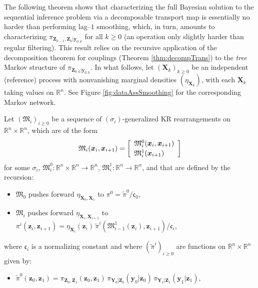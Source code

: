 \documentclass[twoside,11pt]{article}
\newcommand{\re}{\mathbb{R}}
\newcommand{\ra}{\rightarrow}
\newcommand{\Xb}{\boldsymbol{X}}
\newcommand{\xb}{\boldsymbol{x}}
\newcommand{\Yb}{\boldsymbol{Y}}
\newcommand{\yb}{\boldsymbol{y}}
\newcommand{\Zb}{\boldsymbol{Z}}
\newcommand{\zb}{\boldsymbol{z}}
\newcommand{\submap}{\mathfrak{M}}
\begin{document}
%
%
The following theorem shows that
characterizing  the full Bayesian solution to the 
sequential inference problem via a decomposable transport map  
is essentially no harder than performing lag--$1$ smoothing, which,
in turn, amounts
to characterizing $\pi_{\Zb_{k-1},\Zb_{k} \vert \yb_{0:k}}$
%
for all $k\ge 0$
(an operation only slightly
%
harder than regular filtering).
%
%
This result relies on
the recursive application of the decomposition theorem for
couplings (Theorem \ref{thm:decompTrans}) 
to the {\it tree}
Markov structure of $\pi_{\Zb_{0:k} \vert \yb_{0:k}}$.
%
In what follows, let $(\Xb_k)_{k \ge 0}$ be an independent 
%
(reference) process with nonvanishing marginal densities %
$(\eta_{\Xb_k})$, with each $\Xb_k$ taking values on
$\re^n$. %
See Figure \ref{fig:dataAssSmoothing} for the corresponding Markov
network.
%
\begin{theorem} \label{thm:decompSmooth}
%
%
%
%
%
%
        
%
%
%
%
%
%
%
%
Let $(\submap_i)_{i\ge 0}$ be a
sequence of $(\sigma_i)$-generalized 
KR rearrangements on $\re^{n} \times \re^{n} $,
which are %
of the form
%
%
%
%
%
%
\begin{equation}  \label{eq:thm:decompSmooth:upperTriMap} 
\submap_i( \xb_i , \xb_{i+1} ) = \left[\begin{array}{l}
\submap_i^0( \xb_i , \xb_{i+1} ) \\[\spacinglines]
\submap_i^1(\xb_{i+1})
\end{array}\right] %
\end{equation}
for some $\sigma_i$, $\submap_i^0 : \re^{n} \times \re^{n} \ra \re^n$, 
$\submap_i^1 : \re^{n} \ra \re^n$, 
%
%
and that are defined by the recursion: 
%
%
%
%
%
%
  \begin{itemize}[label={--}]
    \item 
    $\submap_0$ pushes forward 
    $\eta_{\Xb_0,\Xb_{1}}$ to
    $\pi^0 = \widetilde{\pi}^0/ \mathfrak{c}_0$,
    \item 
    $\submap_i$
    pushes forward $\eta_{\Xb_i,\Xb_{i+1}}$ to
    $\pi^i(\zb_i, \zb_{i+1}) =
    \eta_{\Xb_i}(\zb_i) \,
    \widetilde{\pi}^i( \submap_{i-1}^1(\zb_i) , \zb_{i+1})/\mathfrak{c}_i$,   
  \end{itemize}
where 
%
%
$\mathfrak{c}_i$ is a normalizing constant
and where
$(\widetilde{\pi}^i)_{i \ge 0}$ 
%
are
functions on $\re^{n} \times \re^{n} $ given by: 
\begin{itemize}[label={--}]
  \item $\widetilde{\pi}^0(\zb_0, \zb_1) = \pi_{\Zb_0,\Zb_1}(\zb_0, \zb_1) \,
    \pi_{\Yb_0 \vert \Zb_0}(\yb_0 \vert \zb_0)  \, 
    \pi_{\Yb_1 \vert \Zb_1}(\yb_1 \vert \zb_1)$,
        

\end{itemize}
\end{theorem}
\end{document}
